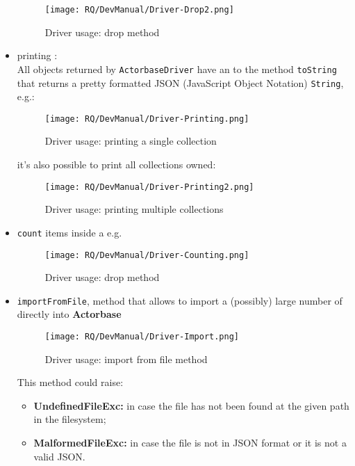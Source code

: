 \documentclass{scalatekids-article}
\begin{document}
\begin{itemize}
\begin{figure}[H]
\begin{center}
      \texttt{[image: RQ/DevManual/Driver-Drop2.png]}
      \caption{Driver usage: drop method}
    \end{center}
  \end{figure}
\item printing :\\All objects returned by \verb=ActorbaseDriver=
  have an  to the method \verb=toString=
  that returns a pretty formatted JSON (JavaScript Object Notation) \verb=String=, e.g.:
  \begin{figure}[H]
    \begin{center}
      \texttt{[image: RQ/DevManual/Driver-Printing.png]}
      \caption{Driver usage: printing a single collection}
    \end{center}
  \end{figure}
  it's also possible to print all collections owned:
  \begin{figure}[H]
    \begin{center}
      \texttt{[image: RQ/DevManual/Driver-Printing2.png]}
      \caption{Driver usage: printing multiple collections}
    \end{center}
  \end{figure}
\item \verb=count= items inside a  e.g.
  \begin{figure}[H]
    \begin{center}
      \texttt{[image: RQ/DevManual/Driver-Counting.png]}
      \caption{Driver usage: drop method}
    \end{center}
  \end{figure}
\item \verb=importFromFile=, method that allows to import a (possibly) large number of 
  directly into \textbf{Actorbase}
  \begin{figure}[H]
    \begin{center}
      \texttt{[image: RQ/DevManual/Driver-Import.png]}
      \caption{Driver usage: import from file method}
    \end{center}
  \end{figure}
  This method could raise:
  \begin{itemize}
  \item \textbf{UndefinedFileExc:} in case the file has not been found at the given path in the filesystem;
  \item \textbf{MalformedFileExc:} in case the file is not in JSON format or it is not a valid JSON.
  \end{itemize}


\end{itemize}
\end{document}
